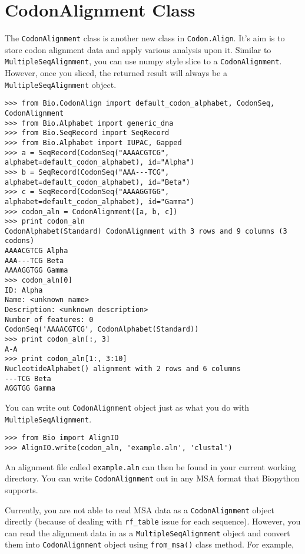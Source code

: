 \section{CodonAlignment Class}

The \verb|CodonAlignment| class is another new class in
\verb|Codon.Align|. It's aim is to store codon alignment data and
apply various analysis upon it. Similar to
\verb|MultipleSeqAlignment|, you can use numpy style slice to a
\verb|CodonAlignment|. However, once you sliced, the returned result
will always be a \verb|MultipleSeqAlignment| object.

\begin{verbatim}
>>> from Bio.CodonAlign import default_codon_alphabet, CodonSeq, CodonAlignment
>>> from Bio.Alphabet import generic_dna
>>> from Bio.SeqRecord import SeqRecord
>>> from Bio.Alphabet import IUPAC, Gapped
>>> a = SeqRecord(CodonSeq("AAAACGTCG", alphabet=default_codon_alphabet), id="Alpha")
>>> b = SeqRecord(CodonSeq("AAA---TCG", alphabet=default_codon_alphabet), id="Beta")
>>> c = SeqRecord(CodonSeq("AAAAGGTGG", alphabet=default_codon_alphabet), id="Gamma")
>>> codon_aln = CodonAlignment([a, b, c])
>>> print codon_aln
CodonAlphabet(Standard) CodonAlignment with 3 rows and 9 columns (3 codons)
AAAACGTCG Alpha
AAA---TCG Beta
AAAAGGTGG Gamma
>>> codon_aln[0]
ID: Alpha
Name: <unknown name>
Description: <unknown description>
Number of features: 0
CodonSeq('AAAACGTCG', CodonAlphabet(Standard))
>>> print codon_aln[:, 3]
A-A
>>> print codon_aln[1:, 3:10]
NucleotideAlphabet() alignment with 2 rows and 6 columns
---TCG Beta
AGGTGG Gamma
\end{verbatim}

You can write out \verb|CodonAlignment| object just as what you do
with \verb|MultipleSeqAlignment|.

\begin{verbatim}
>>> from Bio import AlignIO
>>> AlignIO.write(codon_aln, 'example.aln', 'clustal')
\end{verbatim}

An alignment file called \texttt{example.aln} can then be found in your
current working directory. You can write \verb|CodonAlignment| out in
any MSA format that Biopython supports.

Currently, you are not able to read MSA data as a
\verb|CodonAlignment| object directly (because of dealing with
\texttt{rf\_table} issue for each sequence). However, you can read the
alignment data in as a \verb|MultipleSeqAlignment| object and convert
them into \verb|CodonAlignment| object using \verb|from_msa()|
class method. For example,

